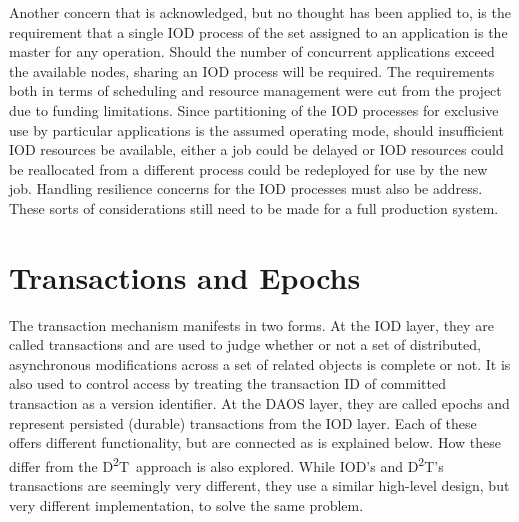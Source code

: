 \documentclass[conference]{IEEEtran}
\newcommand{\DDT}{D\textsuperscript{2}T~}
\newcommand{\DDTns}{D\textsuperscript{2}T}
\begin{document}
Another concern that is acknowledged, but no thought has been applied to, is
the requirement that a single IOD process of the set assigned to an application
is the master for any operation.  Should the number of concurrent applications
exceed the available nodes, sharing an IOD process will be required. The
requirements both in terms of scheduling and resource management were cut from
the project due to funding limitations. Since partitioning of the IOD processes
for exclusive use by particular applications is the assumed operating mode,
should insufficient IOD resources be available, either a job could be delayed
or IOD resources could be reallocated from a different process could be
redeployed for use by the new job. Handling resilience concerns for the IOD
processes must also be address.  These sorts of considerations still need to be
made for a full production system.

\section{Transactions and Epochs}
\label{sec:transactions}

The transaction mechanism manifests in two forms. At the IOD layer, they are
called transactions and are used to judge whether or not a set of distributed,
asynchronous modifications across a set of related objects is complete or not.
It is also used to control access by treating the transaction ID of committed
transaction as a version identifier.  At the DAOS layer, they are called epochs
and represent persisted (durable) transactions from the IOD layer. Each of
these offers different functionality, but are connected as is explained below.
How these differ from the \DDT approach is also explored.  While IOD's and
\DDTns's transactions are seemingly very different, they use a similar
high-level design, but very different implementation, to solve the same
problem.
\end{document}
